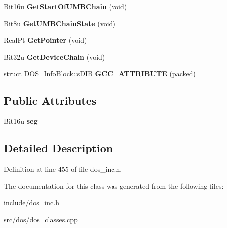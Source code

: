 \begin{DoxyCompactItemize}
\item 
\hypertarget{classDOS__InfoBlock_adb819f949bb84a57ec47b3eadcf8394b}{Bit16u {\bfseries Get\-Start\-Of\-U\-M\-B\-Chain} (void)}\label{classDOS__InfoBlock_adb819f949bb84a57ec47b3eadcf8394b}

\item 
\hypertarget{classDOS__InfoBlock_a77f19be942b10a316e54464547cfb2e2}{Bit8u {\bfseries Get\-U\-M\-B\-Chain\-State} (void)}\label{classDOS__InfoBlock_a77f19be942b10a316e54464547cfb2e2}

\item 
\hypertarget{classDOS__InfoBlock_a872b7fd95a7af22e303971abffc41e86}{Real\-Pt {\bfseries Get\-Pointer} (void)}\label{classDOS__InfoBlock_a872b7fd95a7af22e303971abffc41e86}

\item 
\hypertarget{classDOS__InfoBlock_a79370f3f9f5a228c2b584b330b912dcc}{Bit32u {\bfseries Get\-Device\-Chain} (void)}\label{classDOS__InfoBlock_a79370f3f9f5a228c2b584b330b912dcc}

\item 
\hypertarget{classDOS__InfoBlock_a492f63514c4bc0a876008bd5dffbefb4}{struct \hyperlink{structDOS__InfoBlock_1_1sDIB}{D\-O\-S\-\_\-\-Info\-Block\-::s\-D\-I\-B} {\bfseries G\-C\-C\-\_\-\-A\-T\-T\-R\-I\-B\-U\-T\-E} (packed)}\label{classDOS__InfoBlock_a492f63514c4bc0a876008bd5dffbefb4}

\end{DoxyCompactItemize}
\subsection*{Public Attributes}
\begin{DoxyCompactItemize}
\item 
\hypertarget{classDOS__InfoBlock_ae1079089060526859c4394a55d3153ee}{Bit16u {\bfseries seg}}\label{classDOS__InfoBlock_ae1079089060526859c4394a55d3153ee}

\end{DoxyCompactItemize}


\subsection{Detailed Description}


Definition at line 455 of file dos\-\_\-inc.\-h.



The documentation for this class was generated from the following files\-:\begin{DoxyCompactItemize}
\item 
include/dos\-\_\-inc.\-h\item 
src/dos/dos\-\_\-classes.\-cpp\end{DoxyCompactItemize}
